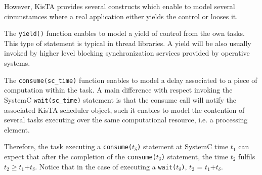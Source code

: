 However, KisTA provides several constructs which enable to model several
circunstamces where a real application either yields the control or
looses it.

The \texttt{yield()} function enables to model a yield of control from the
own tasks.
This type of statement is typical in thread libraries.
A yield will be also usually invoked by higher level blocking synchronization
services provided by operative systems.

The \texttt{consume(sc\_time)} function enables to model a delay associated
to a piece of computation within the task. 
A main difference with respect invoking the SystemC \texttt{wait(sc\_time)}
statement is that the consume call will notify the associated KisTA scheduler 
object, such it enables to model the contention of several tasks executing
over the same computational resource, i.e. a processing element.

Therefore, the task executing a \texttt{consume($t_{\delta}$)} statement at 
SystemC time $t_1$ can expect that after the completion of the 
\texttt{consume($t_{\delta}$)} statement, the time  $t_2$ fulfils
 $t_2 \ge t_1$+$t_{\delta}$.
Notice that in the case of executing a \texttt{wait($t_{\delta}$)},
$t_2$ = $t_1$+$t_{\delta}$.


 
